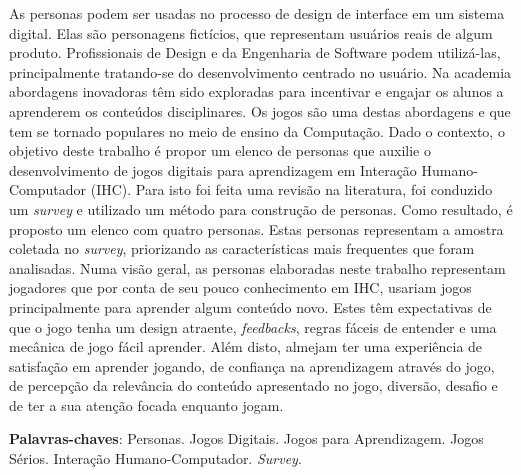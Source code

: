 \begin{resumo}

As personas podem ser usadas no processo de design de interface em um sistema digital. Elas são personagens fictícios, que representam usuários reais de algum produto. Profissionais de Design e da Engenharia de Software podem utilizá-las, principalmente tratando-se do desenvolvimento centrado no usuário. Na academia abordagens inovadoras têm sido exploradas para incentivar e engajar os alunos a aprenderem os conteúdos disciplinares. Os jogos são uma destas abordagens e que tem se tornado populares no meio de ensino da Computação. Dado o contexto, o objetivo deste trabalho é propor um elenco de personas que auxilie o desenvolvimento de jogos digitais para aprendizagem em Interação Humano-Computador (IHC). Para isto foi feita uma revisão na literatura, foi conduzido um \textit{survey} e utilizado um método para construção de personas. Como resultado, é proposto um elenco com quatro personas. Estas personas representam a amostra coletada no \textit{survey}, priorizando as características mais frequentes que foram analisadas. Numa visão geral, as personas elaboradas neste trabalho representam jogadores que por conta de seu pouco conhecimento em IHC, usariam jogos principalmente para aprender algum conteúdo novo. Estes têm expectativas de que o jogo tenha um design atraente, \textit{feedbacks}, regras fáceis de entender e uma mecânica de jogo fácil aprender. Além disto, almejam ter uma experiência de satisfação em aprender jogando, de confiança na aprendizagem através do jogo, de percepção da relevância do conteúdo apresentado no jogo, diversão, desafio e de ter a sua atenção focada enquanto jogam.


\vspace{\onelineskip}
    
\noindent
\textbf{Palavras-chaves}: Personas. Jogos Digitais. Jogos para Aprendizagem. Jogos Sérios. Interação Humano-Computador. \textit{Survey}.
\end{resumo}
